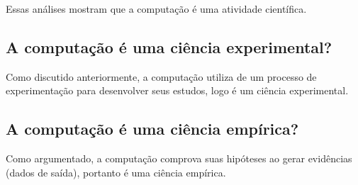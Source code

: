 Essas análises mostram que a computação é uma atividade científica.

\subsection{A computação é uma ciência experimental?}

Como discutido anteriormente, a computação utiliza de um processo de experimentação para desenvolver seus estudos, logo é um ciência experimental.

\subsection{A computação é uma ciência empírica?}

Como argumentado, a computação comprova suas hipóteses ao gerar evidências (dados de saída), portanto é uma ciência empírica.